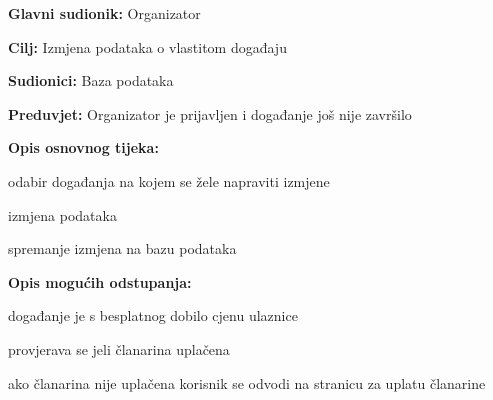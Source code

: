 					\noindent {}
					\begin{packed_item}
	
						\item \textbf{Glavni sudionik: }Organizator
						\item  \textbf{Cilj:} Izmjena podataka o vlastitom događaju
						\item  \textbf{Sudionici:} Baza podataka
						\item  \textbf{Preduvjet:} Organizator je prijavljen i događanje još nije završilo
						\item  \textbf{Opis osnovnog tijeka:}
						
						\item[] \begin{packed_enum}
	
							\item odabir događanja na kojem se žele napraviti izmjene
							\item izmjena podataka
							\item spremanje izmjena na bazu podataka
							
						\end{packed_enum}
						
						\item  \textbf{Opis mogućih odstupanja:}
						
						\item[] \begin{packed_item}
	
							\item[2.a] događanje je s besplatnog dobilo cjenu ulaznice
							\item[] \begin{packed_enum}
								
								\item provjerava se jeli članarina uplačena
								\item ako članarina nije uplačena korisnik se odvodi na stranicu za uplatu članarine
								
							\end{packed_enum}
						\end{packed_item}
							
					\end{packed_item}
					
